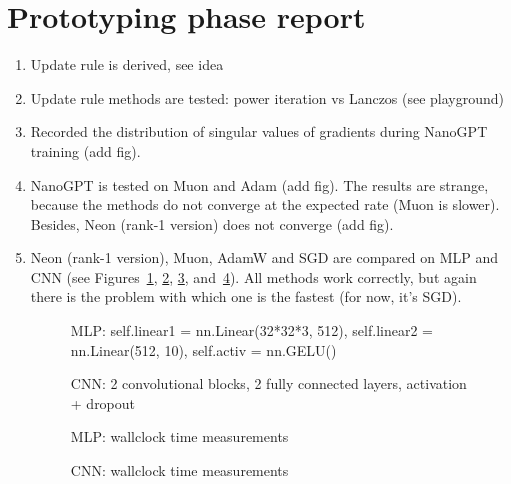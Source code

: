 \documentclass[]{scrartcl}
\begin{document}
\section{Prototyping phase report}
\begin{enumerate}
    \item Update rule is derived, see idea
    \item Update rule methods are tested: power iteration vs Lanczos (see playground)
    \item Recorded the distribution of singular values of gradients during NanoGPT training (add fig).
    \item NanoGPT is tested on Muon and Adam (add fig). The results are strange, because the methods do not converge at the expected rate (Muon is slower). Besides, Neon (rank-1 version) does not converge (add fig).
    \item Neon (rank-1 version), Muon, AdamW and SGD are compared on MLP and CNN (see Figures~\ref{fig:mlp_epochs}, \ref{fig:cnn_epochs}, \ref{fig:mlp_time}, and~\ref{fig:cnn_time}). All methods work correctly, but again there is the problem with which one is the fastest (for now, it's SGD).
    \begin{figure}[h!]
        \caption{MLP: self.linear1 = nn.Linear(32*32*3, 512), self.linear2 = nn.Linear(512, 10), self.activ = nn.GELU()}
        \label{fig:mlp_epochs}
    \end{figure}
    \begin{figure}[h!]
        \caption{CNN: 2 convolutional blocks, 2 fully connected layers, activation + dropout}
        \label{fig:cnn_epochs}
    \end{figure}
    \begin{figure}[h!]
        \caption{MLP: wallclock time measurements}
        \label{fig:mlp_time}
    \end{figure}
    \begin{figure}[h!]
        \caption{CNN: wallclock time measurements}
        \label{fig:cnn_time}
    \end{figure}
\end{enumerate}



\end{document}
